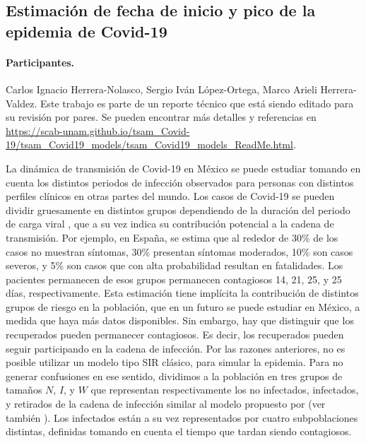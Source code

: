 
\subsection*{Estimación de fecha de inicio y pico de la epidemia de Covid-19}
\paragraph{Participantes.} Carlos Ignacio Herrera-Nolasco, Sergio Iván López-Ortega, Marco Arieli Herrera-Valdez. Este trabajo es parte de un reporte técnico que está siendo editado para su revisión por pares. Se pueden encontrar más detalles y referencias en \url{https://scab-unam.github.io/tsam_Covid-19/tsam_Covid19_models/tsam_Covid19_models_ReadMe.html}.

La dinámica de transmisión de Covid-19 en México se puede estudiar tomando en cuenta los distintos periodos de infección observados para personas con distintos perfiles clínicos en otras partes del mundo.
Los casos de Covid-19 se pueden dividir gruesamente en distintos grupos dependiendo de la duración del periodo de carga viral \citep{zhou2020clinical}, que a su vez indica su contribución potencial a la cadena de transmisión. Por ejemplo, en España, se estima que al rededor de 30\% de los casos no muestran síntomas, 30\% presentan síntomas moderados, 10\% son casos severos, y 5\% son casos que con alta probabilidad resultan en fatalidades.  Los pacientes permanecen de esos grupos permanecen contagiosos 14, 21, 25, y 25 días, respectivamente.
Esta estimación tiene implícita la contribución de distintos grupos de riesgo en la población, que en un futuro se puede estudiar en México, a medida que haya más datos disponibles.
Sin embargo, hay que distinguir que los recuperados pueden permanecer contagiosos. Es decir, los recuperados pueden seguir participando en la cadena de infección. Por las razones anteriores, no es posible utilizar un modelo tipo SIR clásico, para simular la epidemia. Para no generar confusiones en ese sentido, dividimos a la población en tres grupos de tamaños $N$, $I$, y $W$ que representan respectivamente los no infectados, infectados, y retirados de la cadena de infección similar al modelo propuesto por \cite{herrera2020tesis} (ver también \cite{herrera2020pNIW}). Los infectados están a su vez representados por cuatro subpoblaciones distintas, definidas tomando en cuenta el tiempo que tardan siendo contagiosos.


